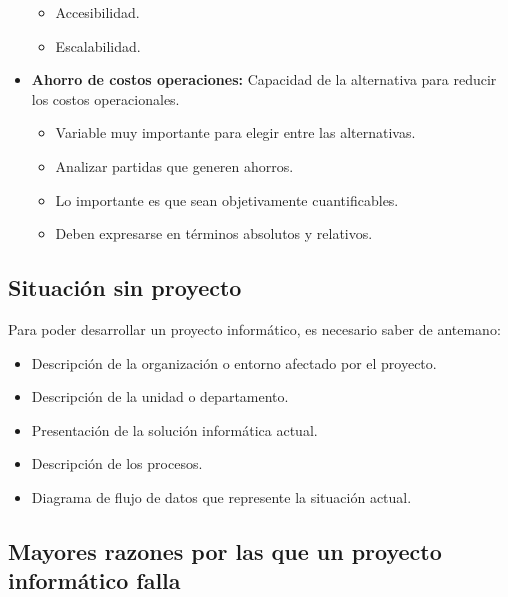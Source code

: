\documentclass{templateNote}
\begin{document}
\begin{itemize}
\begin{itemize}
        \item Accesibilidad.
        \item Escalabilidad.
    \end{itemize}
    \item \textbf{Ahorro de costos operaciones:} Capacidad de la alternativa para reducir los costos operacionales.
    \begin{itemize}
        \item Variable muy importante para elegir entre las alternativas.
        \item Analizar partidas que generen ahorros.
        \item Lo importante es que sean objetivamente cuantificables.
        \item Deben expresarse en términos absolutos y relativos.
    \end{itemize}
\end{itemize}

\subsection{Situación sin proyecto}
Para poder desarrollar un proyecto informático, es necesario saber de antemano:
\begin{itemize}
    \item Descripción de la organización o entorno afectado por el proyecto.
    \item Descripción de la unidad o departamento.
    \item Presentación de la solución informática actual.
    \item Descripción de los procesos.
    \item Diagrama de flujo de datos que represente la situación actual.
\end{itemize}

\subsection{Mayores razones por las que un proyecto informático falla}\label{sec:razones-falla}
\end{document}
